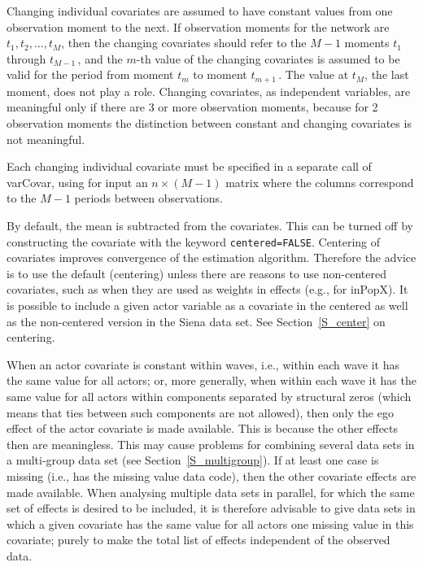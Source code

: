 \documentclass[a4paper,fleqn,11pt]{article}
\newcommand{\+}{\, + \,}
\newcommand{\sfn}[1]{\textsf{#1}}
\begin{document}
Changing individual covariates are assumed to have constant values from one
observation moment to the next. If observation moments for the
network are $t_1, t_2, ..., t_M$, then the changing covariates
should refer to the $M-1$ moments $t_1$ through $t_{M-1}\,$, and
the $m$-th value of the changing covariates is assumed to be valid
for the period from moment $t_m$ to moment $t_{m+1}\,$.
The value at $t_M$, the last moment, does not play a role.
Changing covariates, as independent variables, are meaningful
only if there are 3 or more observation moments,
because for 2 observation moments the distinction between
constant and changing covariates is not meaningful.

Each changing individual covariate must be specified
in a separate call of \sfn{varCovar}, using for input
an $n \times (M-1)$ matrix where the columns correspond to the $M-1$ periods
between observations.

By default, the mean is subtracted from the covariates.
This can be turned off by constructing the covariate with the keyword
\texttt{centered=FALSE}. Centering of covariates improves
convergence of the estimation algorithm.
Therefore the advice is to use the default (centering) unless there are reasons to
use non-centered covariates, such as when they are used as weights in effects
(e.g., for inPopX).
It is possible to include a given actor variable as a covariate in the centered
as well as the non-centered version in the Siena data set.
See Section~\ref{S_center} on centering.

When an actor covariate is constant within waves, i.e.,
within each wave it has the same value for all actors;
or, more generally, when within each wave it has the same value for
all actors
within components separated by structural zeros (which means that
ties between such components are not allowed), then only the ego effect
of the actor covariate is made available.
This is because the other effects then are meaningless.
This may cause problems for combining several data sets
in a multi-group data set (see Section~\ref{S_multigroup}).
If at least one case is missing (i.e., has the missing value data code),
then the other covariate effects are made available.
When analysing multiple data sets in parallel,
for which the same set of effects is desired to be included,
it is therefore advisable to give data sets in which
a given covariate has the same value for all actors
one missing value in this covariate; purely to make
the total list of effects independent of the observed data.
\end{document}
